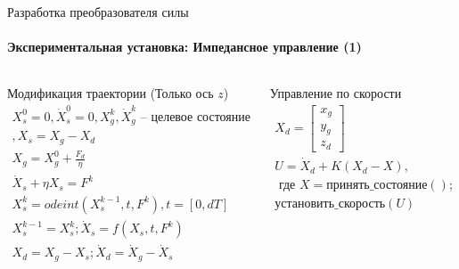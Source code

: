 \documentclass[aspectratio=169,xcolor=table]{beamer}
\begin{document}
\begin{frame}[t]{Разработка преобразователя силы}
    \framesubtitle{Экспериментальная установка: Импедансное управление (1)}
    \vspace{-18pt}
    \begin{columns}[T,onlytextwidth]
        \begin{column}{0.55\textwidth}
            \begin{exampleblock}{Модификация траектории (Только ось $z$)}
                \vspace{-14pt}
                \begin{eqnarray*}
                    X_s^0 = 0, \dot{X}_s^0 =0,  X_g^k, \dot{X}_g^k \text{ -- целевое состояние}\\, X_s = X_g - X_d \\
                    X_g = X_g^0 + \frac{F_d}{\eta } \\
                    \dot{X}_s + \eta  X_s = F^k \\
                    X_s^k = odeint(X_s^{k-1},t,F^k), t = [0,dT] \\
                    X_s^{k-1} = X_s^k;  \dot{X}_s = f(X_s,t,F^k) \\
                    X_d = X_g - X_s; \dot{X}_d = \dot{X}_g - \dot{X}_s
                \end{eqnarray*}
            \end{exampleblock}
        \end{column}
        \begin{column}{0.40\textwidth}
            \begin{exampleblock}{Управление по скорости}
                \vspace{-14pt}
                \begin{eqnarray*}
                    X_d = \begin{bmatrix}
                        x_g \\ y_g \\ z_d
                    \end{bmatrix} \\
                    U = \dot{X}_d + K(X_d - X), \\ \text{ где } X=\text{принять\_состояние}(); \\ 
                    \text{установить\_скорость}(U)
                \end{eqnarray*}
            \end{exampleblock}
        \end{column}
    \end{columns}
\end{frame}
\end{document}
